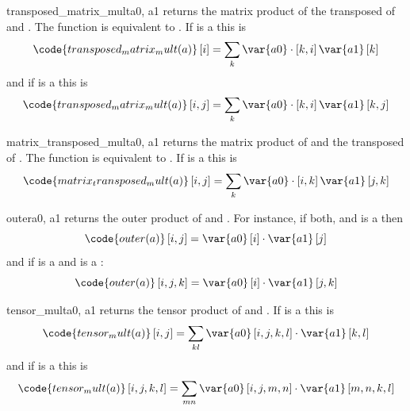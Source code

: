 \begin{funcdesc}{transposed_matrix_mult}{a0, a1}
returns the matrix product of the transposed of  and .
The function is equivalent to .
If  is a \RankOne this is
\begin{equation}
\code{transposed_matrix_mult(a)}\left[i\right]=\sum_{k}\var{a0}  \cdot \left[k,i\right]\var{a1} \left[k\right]
\end{equation}
and if  is a \RankTwo this is
\begin{equation}
\code{transposed_matrix_mult(a)}\left[i,j\right]=\sum_{k}\var{a0}  \cdot \left[k,i\right]\var{a1} \left[k,j\right]
\end{equation}
\end{funcdesc}

\begin{funcdesc}{matrix_transposed_mult}{a0, a1}
returns the matrix product of  and the transposed of .
The function is equivalent to .
If  is a \RankTwo this is
\begin{equation}
\code{matrix_transposed_mult(a)}\left[i,j\right]=\sum_{k}\var{a0}  \cdot \left[i,k\right]\var{a1} \left[j,k\right]
\end{equation}
\end{funcdesc}

\begin{funcdesc}{outer}{a0, a1}
returns the outer product of  and .
For instance, if both,  and  is a \RankOne then
\begin{equation}
\code{outer(a)}\left[i,j\right]=\var{a0} \left[i\right]  \cdot  \var{a1}\left[j\right]
\end{equation}
and if  is a \RankOne and  is a \RankThree:
\begin{equation}
\code{outer(a)}\left[i,j,k\right]=\var{a0} \left[i\right] \cdot \var{a1}\left[j,k\right]
\end{equation}
\end{funcdesc}

\begin{funcdesc}{tensor_mult}{a0, a1}
returns the tensor product of  and .
If  is a \RankTwo this is
\begin{equation}
\code{tensor_mult(a)}\left[i,j\right]=\sum_{kl}\var{a0}\left[i,j,k,l\right] \cdot \var{a1} \left[k,l\right]
\end{equation}
and if  is a \RankFour this is
\begin{equation}
\code{tensor_mult(a)}\left[i,j,k,l\right]=\sum_{mn}\var{a0} \left[i,j,m,n\right] \cdot \var{a1} \left[m,n,k,l\right]
\end{equation}
\end{funcdesc}


